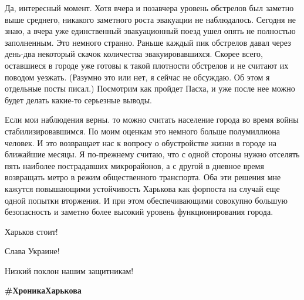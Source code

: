 Да, интересный момент. Хотя вчера и позавчера уровень обстрелов был заметно
выше среднего, никакого заметного роста эвакуации не наблюдалось. Сегодня не
знаю, а вчера уже единственный эвакуационный поезд ушел опять не полностью
заполненным. Это немного странно. Раньше каждый пик обстрелов давал через
день-два некоторый скачок количества эвакуировавшихся. Скорее всего, оставшиеся
в городе уже готовы к такой плотности обстрелов и не считают их поводом
уезжать. (Разумно это или нет, я сейчас не обсуждаю. Об этом я отдельные посты
писал.) Посмотрим как пройдет Пасха, и уже после нее можно будет делать
какие-то серьезные выводы. 

Если мои наблюдения верны. то можно считать население города во время войны
стабилизировавшимся. По моим оценкам это немного больше полумиллиона человек. И
это возвращает нас к вопросу о обустройстве жизни в городе на ближайшие месяцы.
Я по-прежнему считаю, что с одной стороны нужно отселять пять наиболее
пострадавших микрорайонов, а с другой в дневное время возвращать метро в режим
общественного транспорта. Оба эти решения мне кажутся повышающими устойчивость
Харькова как форпоста на случай еще одной попытки вторжения. И при этом
обеспечивающими совокупно большую безопасность и заметно более высокий уровень
функционирования города.

Харьков стоит!

Слава Украине!

Низкий поклон нашим защитникам!

\textbf{\#ХроникаХарькова}


